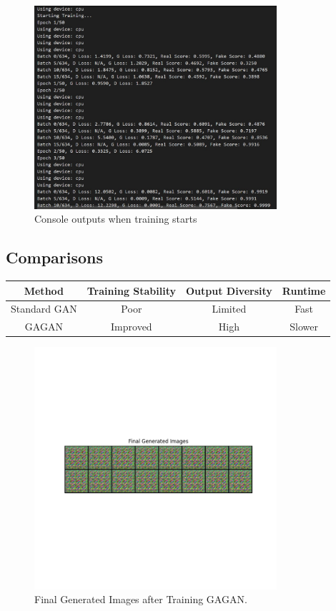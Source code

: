 \documentclass[12pt]{article}
\begin{document}
\begin{figure}[h!]
\centering
\includegraphics[width=0.8\textwidth]{tracking_progress.jpg}
\caption{Console outputs when training starts}
\label{fig:training_logs}
\end{figure}


\subsection{Comparisons}
\begin{center}
\begin{tabular}{|c|c|c|c|}
\hline
\textbf{Method} & \textbf{Training Stability} & \textbf{Output Diversity} & \textbf{Runtime} \\
\hline
Standard GAN & Poor & Limited & Fast \\
GAGAN        & Improved & High & Slower \\
\hline
\end{tabular}
\end{center}

\begin{figure}[h!]
\centering
\includegraphics[width=0.8\textwidth]{final_generated_images.png}
\caption{Final Generated Images after Training GAGAN.}
\label{fig:final_generated}
\end{figure}
\end{document}
